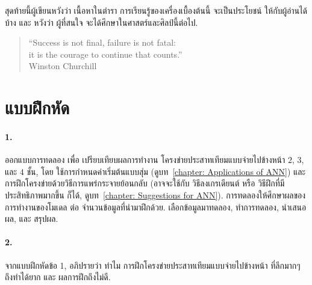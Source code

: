 
สุดท้ายนี้ผู้เขียนหวังว่า เนื้อหาในตำรา การเรียนรู้ของเครื่องเบื้องต้นนี้ จะเป็นประโยชน์ ให้กับผู้อ่านได้บ้าง
และ หวังว่า ผู้ที่สนใจ จะได้ศึกษาในศาสตร์และศิลป์นี้ต่อไป.

\begin{verse}
``Success is not final, failure is not fatal: \\
it is the courage to continue that counts.'' \\
Winston Churchill
\end{verse}








\section{แบบฝึกหัด}
\label{section: Deep exercises}

\paragraph{1.} 
ออกแบบการทดลอง เพื่อ เปรียบเทียบผลการทำงาน โครงข่ายประสาทเทียมแบบจ่ายไปข้างหน้า $2$, $3$, และ $4$ ชั้น, โดย ใช้การกำหนดค่าเริ่มต้นแบบสุ่ม (ดูบท~\ref{chapter: Applications of ANN}) และ การฝึกโครงข่ายด้วยวิธีการแพร่กระจายย้อนกลับ (อาจจะใช้กับ วิธีลงเกรเดียนต์ หรือ วิธีฝึกที่มีประสิทธิภาพมากขึ้น ก็ได้, ดูบท~\ref{chapter: Suggestions for ANN}).
การทดลองให้ศึกษาผลของการทำงานของโมเดล ต่อ จำนวนข้อมูลที่นำมาฝึกด้วย.
เลือกข้อมูลมาทดลอง, ทำการทดลอง, นำเสนอผล, และ สรุปผล.

\paragraph{2.} 
จากแบบฝึกหัดข้อ 1, อภิปรายว่า ทำไม การฝึกโครงข่ายประสาทเทียมแบบจ่ายไปข้างหน้า ที่ลึกมากๆ ถึงทำได้ยาก และ ผลการฝึกถึงไม่ดี.

